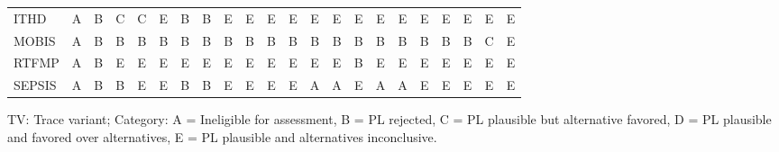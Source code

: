 {\begin{tabular}{lccccccccccccccccccccc}
ITHD & \cellcolor[HTML]{FFFFFF} A & \cellcolor[HTML]{EA4646} B & \cellcolor[HTML]{9670BD} C & \cellcolor[HTML]{9670BD} C & \cellcolor[HTML]{19C8C8} E & \cellcolor[HTML]{EA4646} B & \cellcolor[HTML]{EA4646} B & \cellcolor[HTML]{19C8C8} E & \cellcolor[HTML]{19C8C8} E & \cellcolor[HTML]{19C8C8} E & \cellcolor[HTML]{19C8C8} E & \cellcolor[HTML]{19C8C8} E & \cellcolor[HTML]{19C8C8} E & \cellcolor[HTML]{19C8C8} E & \cellcolor[HTML]{19C8C8} E & \cellcolor[HTML]{19C8C8} E & \cellcolor[HTML]{19C8C8} E & \cellcolor[HTML]{19C8C8} E & \cellcolor[HTML]{19C8C8} E & \cellcolor[HTML]{19C8C8} E & \cellcolor[HTML]{19C8C8} E \\
MOBIS & \cellcolor[HTML]{FFFFFF} A & \cellcolor[HTML]{EA4646} B & \cellcolor[HTML]{EA4646} B & \cellcolor[HTML]{EA4646} B & \cellcolor[HTML]{EA4646} B & \cellcolor[HTML]{EA4646} B & \cellcolor[HTML]{EA4646} B & \cellcolor[HTML]{EA4646} B & \cellcolor[HTML]{EA4646} B & \cellcolor[HTML]{EA4646} B & \cellcolor[HTML]{EA4646} B & \cellcolor[HTML]{EA4646} B & \cellcolor[HTML]{EA4646} B & \cellcolor[HTML]{EA4646} B & \cellcolor[HTML]{EA4646} B & \cellcolor[HTML]{EA4646} B & \cellcolor[HTML]{EA4646} B & \cellcolor[HTML]{EA4646} B & \cellcolor[HTML]{EA4646} B & \cellcolor[HTML]{9670BD} C & \cellcolor[HTML]{19C8C8} E \\
RTFMP & \cellcolor[HTML]{FFFFFF} A & \cellcolor[HTML]{EA4646} B & \cellcolor[HTML]{19C8C8} E & \cellcolor[HTML]{19C8C8} E & \cellcolor[HTML]{19C8C8} E & \cellcolor[HTML]{19C8C8} E & \cellcolor[HTML]{19C8C8} E & \cellcolor[HTML]{19C8C8} E & \cellcolor[HTML]{19C8C8} E & \cellcolor[HTML]{19C8C8} E & \cellcolor[HTML]{19C8C8} E & \cellcolor[HTML]{19C8C8} E & \cellcolor[HTML]{19C8C8} E & \cellcolor[HTML]{EA4646} B & \cellcolor[HTML]{19C8C8} E & \cellcolor[HTML]{19C8C8} E & \cellcolor[HTML]{19C8C8} E & \cellcolor[HTML]{19C8C8} E & \cellcolor[HTML]{19C8C8} E & \cellcolor[HTML]{19C8C8} E & \cellcolor[HTML]{19C8C8} E \\
SEPSIS & \cellcolor[HTML]{FFFFFF} A & \cellcolor[HTML]{EA4646} B & \cellcolor[HTML]{EA4646} B & \cellcolor[HTML]{19C8C8} E & \cellcolor[HTML]{19C8C8} E & \cellcolor[HTML]{EA4646} B & \cellcolor[HTML]{EA4646} B & \cellcolor[HTML]{19C8C8} E & \cellcolor[HTML]{19C8C8} E & \cellcolor[HTML]{19C8C8} E & \cellcolor[HTML]{19C8C8} E & \cellcolor[HTML]{FFFFFF} A & \cellcolor[HTML]{FFFFFF} A & \cellcolor[HTML]{19C8C8} E & \cellcolor[HTML]{FFFFFF} A & \cellcolor[HTML]{FFFFFF} A & \cellcolor[HTML]{19C8C8} E & \cellcolor[HTML]{19C8C8} E & \cellcolor[HTML]{19C8C8} E & \cellcolor[HTML]{19C8C8} E & \cellcolor[HTML]{19C8C8} E \\
\bottomrule
\end{tabular}
}
\begin{center}\footnotesize
TV: Trace variant; \quad Category: A = Ineligible for assessment, B = PL rejected, C = PL plausible but alternative favored, D = PL plausible and favored over alternatives, E = PL plausible and alternatives inconclusive.
\end{center}
